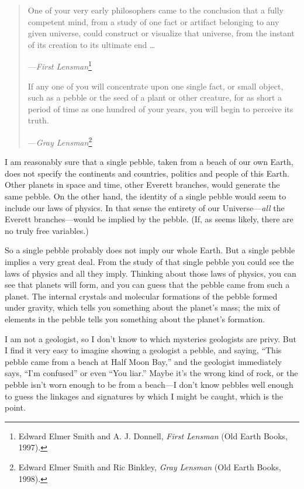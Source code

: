 
\begin{quote}
{
 One of your very early philosophers came to the conclusion that a
fully competent mind, from a study of one fact or artifact belonging to
any given universe, could construct or visualize that universe, from
the instant of its creation to its ultimate end \ldots}

{\raggedleft
 {}---\textit{First Lensman}\footnote{Edward Elmer Smith and A. J. Donnell, \textit{First Lensman}
(Old Earth Books, 1997).}
\par}


{
 If any one of you will concentrate upon one single fact, or small
object, such as a pebble or the seed of a plant or other creature, for
as short a period of time as one hundred of your years, you will begin
to perceive its truth.}

{\raggedleft
 {}---\textit{Gray Lensman}\footnote{Edward Elmer Smith and Ric Binkley, \textit{Gray Lensman} (Old
Earth Books, 1998).}
\par}
\end{quote}

{
 I am reasonably sure that a single pebble, taken from a beach of
our own Earth, does not specify the continents and countries, politics
and people of this Earth. Other planets in space and time, other
Everett branches, would generate the same pebble. On the other hand,
the identity of a single pebble would seem to include our laws of
physics. In that sense the entirety of our Universe---\textit{all} the
Everett branches---would be implied by the pebble. (If, as seems
likely, there are no truly free variables.)}

{
 So a single pebble probably does not imply our whole Earth. But a
single pebble implies a very great deal. From the study of that single
pebble you could see the laws of physics and all they imply. Thinking
about those laws of physics, you can see that planets will form, and
you can guess that the pebble came from such a planet. The internal
crystals and molecular formations of the pebble formed under gravity,
which tells you something about the planet's mass; the
mix of elements in the pebble tells you something about the
planet's formation.}

{
 I am not a geologist, so I don't know to which
mysteries geologists are privy. But I find it very easy to imagine
showing a geologist a pebble, and saying, ``This
pebble came from a beach at Half Moon Bay,'' and the
geologist immediately says, ``I'm
confused'' or even ``You
liar.'' Maybe it's the wrong kind of
rock, or the pebble isn't worn enough to be from a
beach---I don't know pebbles well enough to guess the
linkages and signatures by which I might be caught, which is the
point.}

